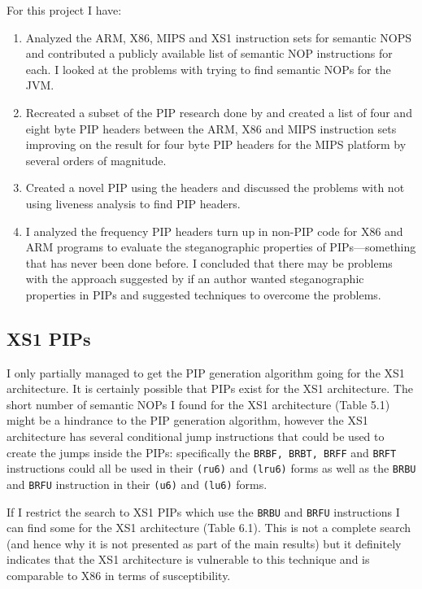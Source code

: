 \documentclass[10pt]{book}
\begin{document}
For this project I have:

\begin{enumerate}[1.]
\item
  Analyzed the ARM, X86, MIPS and XS1 instruction sets for semantic NOPS
  and contributed a publicly available list of semantic NOP instructions
  for each. I looked at the problems with trying to find semantic NOPs
  for the JVM.
\item
  Recreated a subset of the PIP research done by \autocite{Cha:2010uh}
  and created a list of four and eight byte PIP headers between the ARM,
  X86 and MIPS instruction sets improving on the result for four byte
  PIP headers for the MIPS platform by several orders of
  magnitude\autocite{Cha:2010uh}.
\item
  Created a novel PIP using the headers and discussed the problems with
  not using liveness analysis to find PIP headers.
\item
  I analyzed the frequency PIP headers turn up in non-PIP code for X86
  and ARM programs to evaluate the steganographic properties of
  PIPs---something that has never been done before. I concluded that
  there may be problems with the approach suggested by
  \autocite{Cha:2010uh} if an author wanted steganographic properties in
  PIPs and suggested techniques to overcome the problems.
\end{enumerate}
\subsection{XS1 PIPs}

I only partially managed to get the PIP generation algorithm going for
the XS1 architecture. It is certainly possible that PIPs exist for the
XS1 architecture. The short number of semantic NOPs I found for the XS1
architecture (Table 5.1) might be a hindrance to the PIP generation
algorithm, however the XS1 architecture has several conditional jump
instructions that could be used to create the jumps inside the PIPs:
specifically the \lstinline!BRBF, BRBT, BRFF! and \lstinline!BRFT!
instructions could all be used in their \lstinline!(ru6)! and
\lstinline!(lru6)! forms as well as the \lstinline!BRBU! and
\lstinline!BRFU! instruction in their \lstinline!(u6)! and
\lstinline!(lu6)! forms\autocite{May:ua}.

If I restrict the search to XS1 PIPs which use the \lstinline!BRBU! and
\lstinline!BRFU! instructions I can find some for the XS1 architecture
(Table 6.1). This is not a complete search (and hence why it is not
presented as part of the main results) but it definitely indicates that
the XS1 architecture is vulnerable to this technique and is comparable
to X86 in terms of susceptibility.
\end{document}
